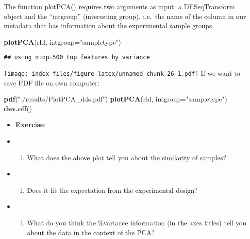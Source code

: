 \documentclass[
]{article}
\newenvironment{Shaded}{\begin{snugshade}}{\end{snugshade}}
\newcommand{\AttributeTok}[1]{\textcolor[rgb]{0.13,0.29,0.53}{#1}}
\newcommand{\FunctionTok}[1]{\textcolor[rgb]{0.13,0.29,0.53}{\textbf{#1}}}
\newcommand{\NormalTok}[1]{#1}
\newcommand{\StringTok}[1]{\textcolor[rgb]{0.31,0.60,0.02}{#1}}
\providecommand{\tightlist}{%
  \setlength{\itemsep}{0pt}\setlength{\parskip}{0pt}}
\begin{document}
The function plotPCA() requires two arguments as input: a DESeqTransform
object and the ``intgroup'' (interesting group), i.e.~the name of the
column in our metadata that has information about the experimental
sample groups.

\begin{Shaded}
\begin{Highlighting}[]
\FunctionTok{plotPCA}\NormalTok{(rld, }\AttributeTok{intgroup=}\StringTok{"sampletype"}\NormalTok{)}
\end{Highlighting}
\end{Shaded}

\begin{verbatim}
## using ntop=500 top features by variance
\end{verbatim}

\texttt{[image: index\_files/figure-latex/unnamed-chunk-26-1.pdf]} If we
want to save PDF file on own computer:

\begin{Shaded}
\begin{Highlighting}[]
\FunctionTok{pdf}\NormalTok{(}\StringTok{"./results/PlotPCA\_dds.pdf"}\NormalTok{)}
\FunctionTok{plotPCA}\NormalTok{(rld, }\AttributeTok{intgroup=}\StringTok{"sampletype"}\NormalTok{)}
\FunctionTok{dev.off}\NormalTok{()}
\end{Highlighting}
\end{Shaded}

\begin{itemize}
\item
  \textbf{Exercise}:
\item
  \begin{enumerate}
  \def\labelenumi{\arabic{enumi}.}
  \tightlist
  \item
    What does the above plot tell you about the similarity of samples?
  \end{enumerate}
\item
  \begin{enumerate}
  \def\labelenumi{\arabic{enumi}.}
  \setcounter{enumi}{1}
  \tightlist
  \item
    Does it fit the expectation from the experimental design?
  \end{enumerate}
\item
  \begin{enumerate}
  \def\labelenumi{\arabic{enumi}.}
  \setcounter{enumi}{2}
  \tightlist
  \item
    What do you think the \%variance information (in the axes titles)
    tell you about the data in the context of the PCA?
  \end{enumerate}
\end{itemize}
\end{document}
